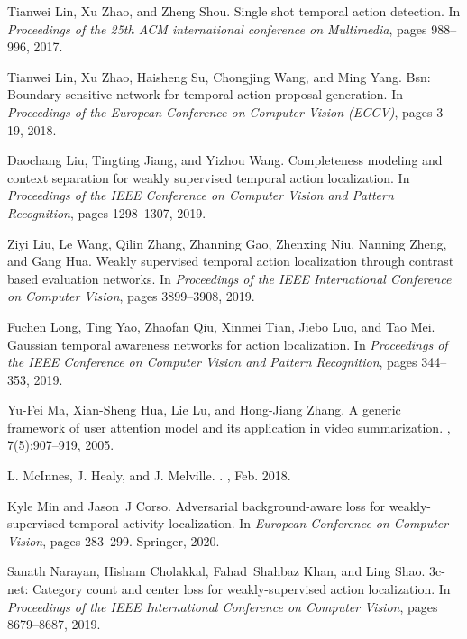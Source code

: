 \documentclass[final]{cvpr}
\begin{document}
\begin{table*}[t]
{\begin{thebibliography}{10}
Tianwei Lin, Xu Zhao, and Zheng Shou.
\newblock Single shot temporal action detection.
\newblock In {\em Proceedings of the 25th ACM international conference on
  Multimedia}, pages 988--996, 2017.

Tianwei Lin, Xu Zhao, Haisheng Su, Chongjing Wang, and Ming Yang.
\newblock Bsn: Boundary sensitive network for temporal action proposal
  generation.
\newblock In {\em Proceedings of the European Conference on Computer Vision
  (ECCV)}, pages 3--19, 2018.

Daochang Liu, Tingting Jiang, and Yizhou Wang.
\newblock Completeness modeling and context separation for weakly supervised
  temporal action localization.
\newblock In {\em Proceedings of the IEEE Conference on Computer Vision and
  Pattern Recognition}, pages 1298--1307, 2019.

Ziyi Liu, Le Wang, Qilin Zhang, Zhanning Gao, Zhenxing Niu, Nanning Zheng, and
  Gang Hua.
\newblock Weakly supervised temporal action localization through contrast based
  evaluation networks.
\newblock In {\em Proceedings of the IEEE International Conference on Computer
  Vision}, pages 3899--3908, 2019.

Fuchen Long, Ting Yao, Zhaofan Qiu, Xinmei Tian, Jiebo Luo, and Tao Mei.
\newblock Gaussian temporal awareness networks for action localization.
\newblock In {\em Proceedings of the IEEE Conference on Computer Vision and
  Pattern Recognition}, pages 344--353, 2019.

Yu-Fei Ma, Xian-Sheng Hua, Lie Lu, and Hong-Jiang Zhang.
\newblock A generic framework of user attention model and its application in
  video summarization.
, 7(5):907--919, 2005.

L. {McInnes}, J. {Healy}, and J. {Melville}.
.
, Feb. 2018.

Kyle Min and Jason~J Corso.
\newblock Adversarial background-aware loss for weakly-supervised temporal
  activity localization.
\newblock In {\em European Conference on Computer Vision}, pages 283--299.
  Springer, 2020.

Sanath Narayan, Hisham Cholakkal, Fahad~Shahbaz Khan, and Ling Shao.
\newblock 3c-net: Category count and center loss for weakly-supervised action
  localization.
\newblock In {\em Proceedings of the IEEE International Conference on Computer
  Vision}, pages 8679--8687, 2019.


\end{thebibliography}}
\end{table*}
\end{document}
